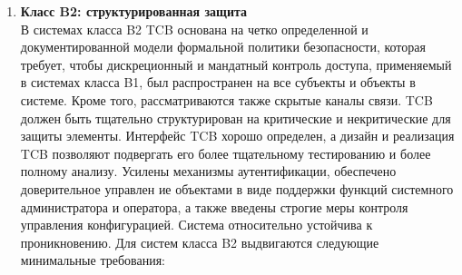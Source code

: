 \begin{enumerate}
\begin{enumerate}
\begin{enumerate}
\begin{enumerate}
\begin{itemize}
                    Защитные механизмы должны быть протестированы и проверены на работоспособность в соответствии с сопроводительной документацией на компьютерную систему.  Команда специалистов,
                    досконально разбирающихся в специфике реализации TCB, должна провести тщательный анализ и тестирование проектной документации, исходного и объектного кода системы. Целями такой
                    проверки должны быть: выявление недостатков проектирования и реализации, которые позволят субъекту, внешнему по отношению к TCB, совершать действия (чтение, изменение или удаление данных),
                    обычно отклоняемые мандатными и дискреционными политиками безопасности, применяемыми в TCB; а также проверка того, что ни один субъект не способен привести (без разрешения на это)
                    TCB в состояние, при котором он не сможет отвечать на запросы от других пользователей системы. Все обнаруженные недостатки должны быть устранены, а TCB повторно протестирован для
                    демонстрации отсутствия старых и новых недостатков.
                    \item{\textbf{Спецификация и верификация дизайна системы}}\\
                    Неформальная или формальная модель политики безопасности, поддерживаемая TCB, должна поддерживаться на протяжении всего жизненного цикла системы и соответствовать своим аксиомам.
                \end{itemize}
            \end{enumerate}
        \end{enumerate}
		\item{\textbf{Класс B2: структурированная защита}}\\
		В системах класса B2 TCB основана на четко определенной и документированной модели формальной политики безопасности, которая требует, чтобы дискреционный и мандатный контроль доступа,
		применяемый в системах класса B1, был распространен на все субъекты и объекты в системе. Кроме того, рассматриваются также скрытые каналы связи. TCB должен быть тщательно структурирован
		на критические и некритические для защиты элементы.  Интерфейс TCB хорошо определен, а дизайн и реализация TCB позволяют подвергать его более тщательному тестированию и более
		полному анализу. Усилены механизмы аутентификации, обеспечено доверительное управлен	ие объектами в виде поддержки функций системного администратора и оператора, а также введены
		строгие меры контроля управления конфигурацией. Система относительно устойчива к проникновению. Для систем класса B2 выдвигаются следующие минимальные требования:

\end{enumerate}
\end{enumerate}
